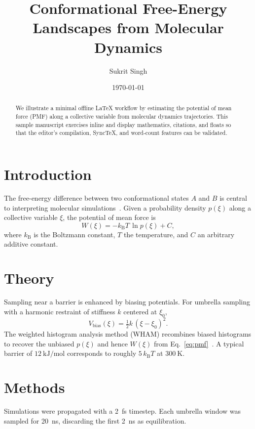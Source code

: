 \documentclass[11pt]{article}
\title{Conformational Free-Energy Landscapes from Molecular Dynamics}
\author{Sukrit Singh}
\date{\today}
\begin{document}
\maketitle

\begin{abstract}
We illustrate a minimal offline LaTeX workflow by estimating the potential of mean
force (PMF) along a collective variable from molecular dynamics trajectories. This
sample manuscript exercises inline and display mathematics, citations, and floats so
that the editor's compilation, SyncTeX, and word-count features can be validated.
\end{abstract}

\section{Introduction}
\label{sec:intro}
The free-energy difference between two conformational states $A$ and $B$ is central to
interpreting molecular simulations~\citep{kollman1993}. Given a probability density
$p(\xi)$ along a collective variable $\xi$, the potential of mean force is
\begin{equation}
  W(\xi) = -k_\mathrm{B} T \, \ln p(\xi) + C,
  \label{eq:pmf}
\end{equation}
where $k_\mathrm{B}$ is the Boltzmann constant, $T$ the temperature, and $C$ an
arbitrary additive constant.

\section{Theory}
\label{sec:theory}
Sampling near a barrier is enhanced by biasing potentials. For umbrella sampling with a
harmonic restraint of stiffness $k$ centered at $\xi_0$,
\begin{equation}
  V_\mathrm{bias}(\xi) = \tfrac{1}{2} k \, (\xi - \xi_0)^2 .
  \label{eq:umbrella}
\end{equation}
The weighted histogram analysis method (WHAM) recombines biased histograms to recover the
unbiased $p(\xi)$ and hence $W(\xi)$ from Eq.~\eqref{eq:pmf}~\citep{kumar1992}. A typical
barrier of $\SI{12}{\kilo\joule\per\mole}$ corresponds to roughly $5\,k_\mathrm{B}T$ at
$\SI{300}{\kelvin}$.

\section{Methods}
\label{sec:methods}
Simulations were propagated with a \SI{2}{\femto\second} timestep. Each umbrella window was
sampled for \SI{20}{\nano\second}, discarding the first \SI{2}{\nano\second} as equilibration.
\end{document}
